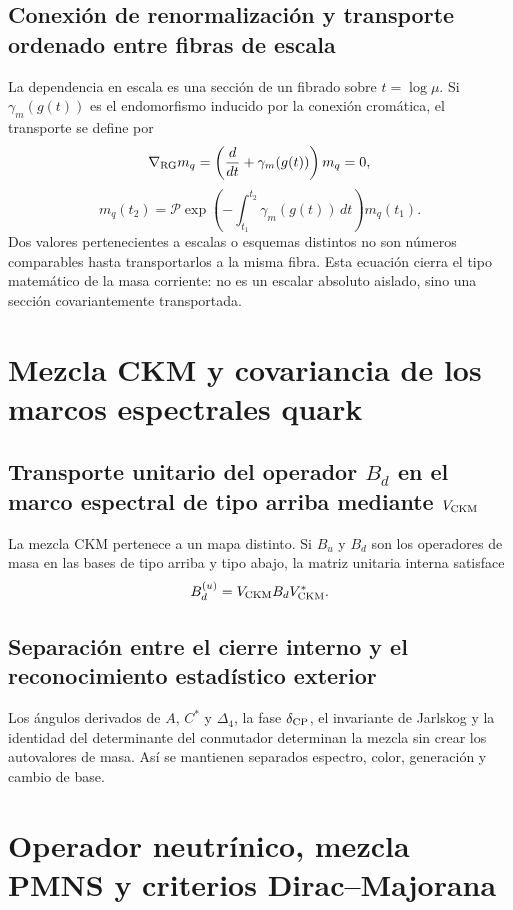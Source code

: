 \subsection{Conexión de renormalización y transporte ordenado entre fibras de escala}

La dependencia en escala es una sección de un fibrado sobre
\(t=\log\mu\). Si \(\gamma_m(g(t))\) es el endomorfismo inducido por la
conexión cromática, el transporte se define por
\[
 \nabla_{\rm RG}m_q
 =\left(\frac{d}{dt}+\gamma_m(g(t))\right)m_q=0,
\]
\[
 m_q(t_2)
 =\mathcal P\exp\!\left(-\int_{t_1}^{t_2}
 \gamma_m(g(t))\,dt\right)m_q(t_1).
\]
Dos valores pertenecientes a escalas o esquemas distintos no son números
comparables hasta transportarlos a la misma fibra. Esta ecuación cierra el
tipo matemático de la masa corriente: no es un escalar absoluto aislado, sino
una sección covariantemente transportada.

\section{Mezcla CKM y covariancia de los marcos espectrales quark}

\subsection{Transporte unitario del operador \texorpdfstring{\(B_d\)}{B_d} en el marco espectral de tipo arriba mediante \texorpdfstring{\(V_{\rm CKM}\)}{V_CKM}}

La mezcla CKM pertenece a un mapa distinto. Si \(B_u\) y \(B_d\) son los
operadores de masa en las bases de tipo arriba y tipo abajo, la matriz unitaria
interna satisface
\[
 B_d^{(u)}=V_{\rm CKM} B_d V_{\rm CKM}^*.
\]

\subsection{Separación entre el cierre interno y el reconocimiento estadístico exterior}

Los ángulos derivados de \(A\), \(C^*\) y \(\Delta_4\), la fase
\(\delta_{\rm CP}\), el invariante de Jarlskog y la identidad del determinante
del conmutador determinan la mezcla sin crear los autovalores de masa. Así se
mantienen separados espectro, color, generación y cambio de base.

\section{Operador neutrínico, mezcla PMNS y criterios Dirac--Majorana}

